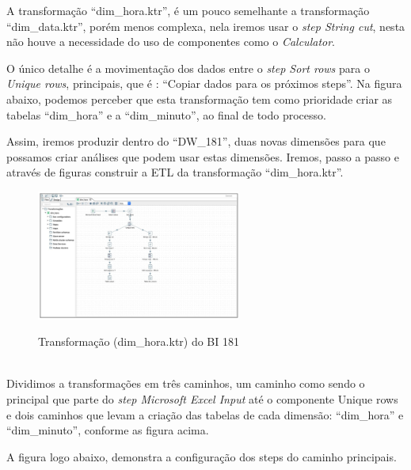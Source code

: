 A transforma\c{c}\~{a}o ``dim\_hora.ktr'', \'{e} um pouco semelhante a transforma\c{c}\~{a}o ``dim\_data.ktr'', por\'{e}m menos complexa, 
nela iremos usar o \textit{step String cut}, nesta n\~{a}o houve a necessidade do uso de componentes como o \textit{Calculator}. 

O único detalhe \'{e} a movimenta\c{c}\~{a}o dos dados entre o \textit{step Sort rows} para o \textit{Unique rows}, principais, 
que \'{e} : ``Copiar dados para os pr\'{o}ximos steps''. Na figura abaixo, podemos perceber que esta transforma\c{c}\~{a}o tem como 
prioridade criar as tabelas ``dim\_hora'' e a ``dim\_minuto'', ao final de todo processo. 

Assim, iremos produzir dentro do ``DW\_181'', duas novas dimens\~{o}es para que possamos criar an\'{a}lises que podem usar estas dimens\~{o}es.
Iremos, passo a passo e atrav\'{e}s de figuras construir a ETL da transforma\c{c}\~{a}o ``dim\_hora.ktr''.

\begin{figure}[H]
	\vspace*{0,2cm}
    \centering
    \caption{Transforma\c{c}\~{a}o (dim\_hora.ktr) do BI 181}
    \includegraphics[width=0.6\textwidth]{./04-figuras/figura-dim-hora}
    \label{fig:ilustfigresdimhora}
\end{figure}
\vspace*{-0,9cm}
{\raggedright {}} \\

Dividimos a transforma\c{c}\~{o}es em três caminhos, um caminho como sendo o principal que parte do \textit{
step Microsoft Excel Input} at\'{e} o componente Unique rows e dois caminhos que  levam a cria\c{c}\~{a}o das tabelas de cada 
dimens\~{a}o: ``dim\_hora'' e ``dim\_minuto'', conforme as figura acima.

A figura logo abaixo, demonstra a configura\c{c}\~{a}o dos steps do caminho principais.


